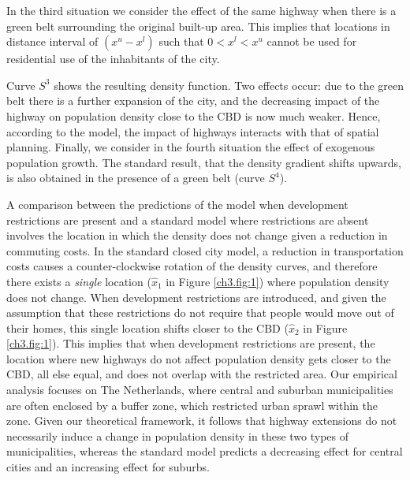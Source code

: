 \documentclass[a4paper,authoryear,review]{elsarticle}  	%
\begin{document}
	In the third situation we consider the effect of the same highway when there is a green belt surrounding the original built-up area. This implies that locations in distance interval of $(x^u-x^l)$ such that $0 < x^l < x^u$ cannot be used for residential use of the inhabitants of the city. 
	
	Curve  $S^{3}$ shows the resulting density function. Two effects occur: due to the green belt there is a further expansion of the city, and the decreasing impact of the highway on population density close to the CBD is now much weaker. Hence, according to the model, the impact of highways interacts with that of spatial planning. Finally, we consider in the fourth situation the effect of exogenous population growth. The standard result, that the density gradient shifts upwards, is also obtained in the presence of a green belt (curve $S^{4}$). 
		
	A comparison between the predictions of the model when development restrictions are present and a standard model where restrictions are absent involves the location in which the density does not change given a reduction in commuting costs. In the standard closed city model, a reduction in transportation costs causes a counter-clockwise rotation of the density curves, and therefore there exists a \textit{single} location ($\hat{x}_1$ in Figure \ref{ch3.fig:1}) where population density does not change. When development restrictions are introduced, and given the assumption that these restrictions do not require that people would move out of their homes, this single location shifts closer to the CBD ($\hat{x}_2$ in Figure \ref{ch3.fig:1}). This implies that when development restrictions are present, the location where new highways do not affect population density gets closer to the CBD, all else equal, and does not overlap with the restricted area. Our empirical analysis focuses on The Netherlands, where central and suburban municipalities are often enclosed by a buffer zone, which restricted urban sprawl within the zone. Given our theoretical framework, it follows that highway extensions do not necessarily induce a change in population density in these two types of municipalities, whereas the standard model predicts a decreasing effect for central cities and an increasing effect for suburbs. 
	
\end{document}
